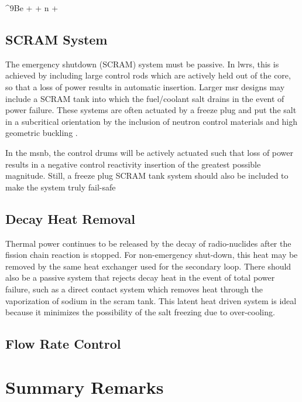 \begin{reaction}\label{rxn:Be-n}
    ^{9}Be + \alpha {} + n + \gamma
\end{reaction}

\subsection{SCRAM System}
The emergency shutdown (\ie SCRAM) system must be passive. In \acsp{lwr}, this is achieved by including large control rods which are actively held out of the core, so that a loss of power results in automatic insertion. Larger \acs{msr} designs may include a SCRAM tank into which the fuel/coolant salt drains in the event of power failure. These systems are often actuated by a freeze plug \cite{FreezePlug} and put the salt in a subcritical orientation by the inclusion of neutron control materials \cite[Ch. 1]{Charit} and high geometric buckling \cite[Ch. 6]{Lamarsh}.

In the \acs{msnb}, the control drums will be actively actuated such that loss of power results in a negative control reactivity insertion of the greatest possible magnitude. Still, a freeze plug SCRAM tank system should also be included to make the system truly fail-safe 

\subsection{Decay Heat Removal}
Thermal power continues to be released by the decay of radio-nuclides after the fission chain reaction is stopped. For non-emergency shut-down, this heat may be removed by the same heat exchanger used for the secondary loop. There should also be a passive system that rejects decay heat in the event of total power failure, such as a direct contact system which removes heat through the vaporization of sodium \cite{DecayHeat} in the scram tank. This latent heat driven system is ideal because it minimizes the possibility of the salt freezing due to over-cooling.

\subsection{Flow Rate Control}


\section{Summary Remarks}